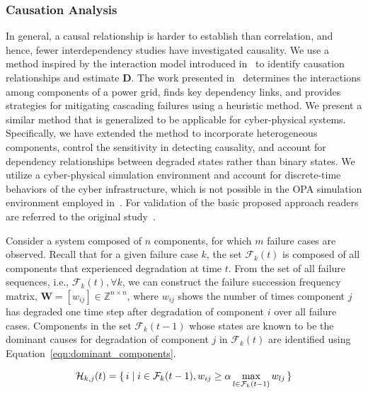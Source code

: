 \documentclass[12pt]{elsarticle}
\begin{document}
\subsubsection{Causation Analysis}
\label{sec:analysis:iden:caus}
In general, a causal relationship is harder to establish than correlation, and hence, fewer interdependency studies have investigated causality. We use a method inspired by the interaction model introduced in~\cite{QiS15} to identify causation relationships and estimate $\mathbf{D}$. The work presented in~\cite{QiS15} determines the interactions among components of a power grid, finds key dependency links, and provides strategies for mitigating cascading failures using a heuristic method. We present a similar method that is generalized to be applicable for cyber-physical systems. Specifically, we have extended the method to incorporate heterogeneous components, control the sensitivity in detecting causality, and account for dependency relationships between degraded states rather than binary states. We utilize a cyber-physical simulation environment and account for discrete-time behaviors of the cyber infrastructure, which is not possible in the OPA simulation environment employed in~\cite{QiS15}. For validation of the basic proposed approach readers are referred to the original study~\cite{QiS15}.

Consider a system composed of $n$ components, for which $m$ failure cases are observed. Recall that for a given failure case $k$, the set $\mathcal{F}_{k}(t)$ is composed of all components that experienced degradation at time $t$. From the set of all failure sequences, i.e., $\mathcal{F}_{k}(t), \forall k$, we can construct the failure succession frequency matrix, $\mathbf{W} = \left[w_{ij}\right] \in \mathbb{Z}^{n \times n}$, where $w_{ij}$ shows the number of times component $j$ has degraded one time step after degradation of component $i$ over all failure cases. Components in the set $\mathcal{F}_{k}(t - 1)$ whose states are known to be the dominant causes for degradation of component $j$ in $\mathcal{F}_{k}(t)$ are identified using Equation~\eqref{eqn:dominant_components}.

\begin{equation}
\label{eqn:dominant_components}
\mathcal{H}_{k, j}(t) = \set{i | i \in \mathcal{F}_{k}(t - 1), w_{ij} \geq \alpha \max\limits_{l \in \mathcal{F}_{k}(t - 1)} w_{lj}}
\end{equation}
\end{document}
